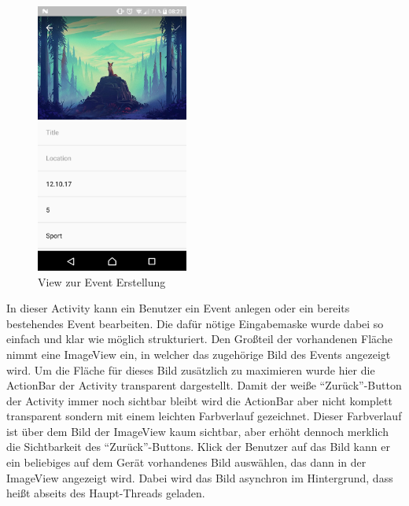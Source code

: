 \documentclass{scrartcl}
\begin{document}
\begin{figure}[h!tbp]
  \centering
  \includegraphics[width=5cm]{img/addevent_1}
  \caption{View zur Event Erstellung}
\end{figure}

In dieser Activity kann ein Benutzer ein Event anlegen oder ein bereits
bestehendes Event bearbeiten. Die dafür nötige Eingabemaske wurde dabei so
einfach und klar wie möglich strukturiert. Den Großteil der vorhandenen Fläche
nimmt eine ImageView ein, in welcher das zugehörige Bild des Events angezeigt
wird. Um die Fläche für dieses Bild zusätzlich zu maximieren wurde hier die
ActionBar der Activity transparent dargestellt. Damit der weiße
\enquote{Zurück}-Button der Activity immer noch sichtbar bleibt wird die
ActionBar aber nicht komplett transparent sondern mit einem leichten Farbverlauf
gezeichnet. Dieser Farbverlauf ist über dem Bild der ImageView kaum sichtbar,
aber erhöht dennoch merklich die Sichtbarkeit des \enquote{Zurück}-Buttons.
Klick der Benutzer auf das Bild kann er ein beliebiges auf dem Gerät vorhandenes
Bild auswählen, das dann in der ImageView angezeigt wird. Dabei wird das Bild
asynchron im Hintergrund, dass heißt abseits des Haupt-Threads geladen.
\end{document}
